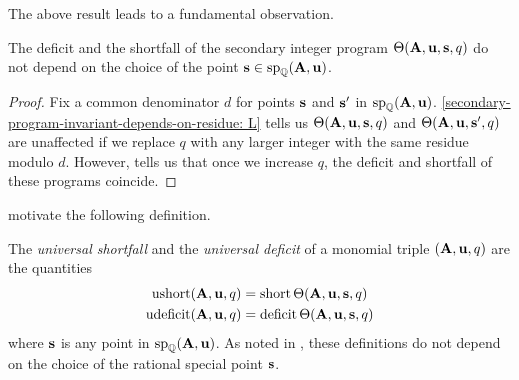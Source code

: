 \documentclass{article}
\begin{document}
The above result leads to a fundamental observation.

\begin{corollary}
   \label{independence: C}
   The deficit and the shortfall of the secondary integer program $\Theta(\mathbf{A}, \mathbf{u}, \mathbf{s}, q)$ do not depend on the choice of the point $\mathbf{s} \in \operatorname{sp}_{\mathbb{Q}}(\mathbf{A}, \mathbf{u})$.
\end{corollary}

\begin{proof}
   Fix a common denominator $d$ for points $\mathbf{s}$ and $\mathbf{s}'$ in $\operatorname{sp}_{\mathbb{Q}}(\mathbf{A}, \mathbf{u})$.  
    \ref{secondary-program-invariant-depends-on-residue: L} tells us $\Theta(\mathbf{A},\mathbf{u},\mathbf{s},q)$  and $\Theta(\mathbf{A},\mathbf{u},\mathbf{s}',q)$ are unaffected if we replace $q$ with any larger integer with the same residue modulo $d$.  However,  tells us that once we increase $q$, the deficit and shortfall of these programs coincide.  
    \end{proof}

 motivate the following definition.

\begin{definition}
\label{independence: D}  The \emph{universal shortfall} and the \emph{universal deficit} of a monomial triple $(\mathbf{A}, \mathbf{u}, q)$ are the quantities
 \begin{align*}
  \operatorname{ushort}(\mathbf{A}, \mathbf{u}, q) & = \operatorname{short}\Theta( \mathbf{A}, \mathbf{u}, \mathbf{s}, q) \\ 
  \operatorname{udeficit}(\mathbf{A}, \mathbf{u}, q) & = \operatorname{deficit}\Theta( \mathbf{A}, \mathbf{u}, \mathbf{s}, q)  
 \end{align*}
where  $\mathbf{s}$ is any point in $\operatorname{sp}_{\mathbb{Q}}(\mathbf{A}, \mathbf{u})$.  As noted in , these definitions do not depend on the choice of the rational special point $\mathbf{s}$.
\end{definition}
\end{document}
